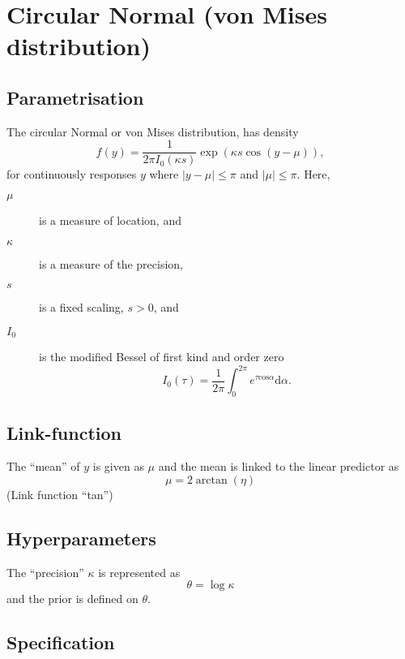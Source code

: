 \documentclass[a4paper,11pt]{article}
\begin{document}
\section*{Circular Normal (von Mises distribution)}

\subsection*{Parametrisation}

The circular Normal or von Mises distribution, has density
\begin{displaymath}
    f(y) = \frac{1}{2\pi  I_{0}(\kappa s)} \exp(\kappa s\cos(y-\mu)), 
\end{displaymath}
for continuously responses $y$ where $|y-\mu| \le \pi$ and $|\mu| \le
\pi$. Here,
\begin{description}
\item[$\mu$] is a measure of location, and
\item[$\kappa$] is a measure of the precision, 
\item[$s$] is a fixed scaling, $s>0$, and
\item[$I_0$] is the modified Bessel of first kind and order zero
    $$I_0(\tau)=\frac{1}{2\pi}\int_0^{2\pi}
    e^{\tau{\mathrm{cos}\alpha}}\mathrm{d}\alpha.$$
\end{description}

\subsection*{Link-function}

The ``mean'' of $y$ is given as $\mu$ and the mean is linked to the
linear predictor as
\begin{displaymath}
    \mu = 2\arctan(\eta)
\end{displaymath}
(Link function ``tan'')

\subsection*{Hyperparameters}

The ``precision'' $\kappa$ is represented as
\begin{displaymath}
    \theta = \log \kappa
\end{displaymath}
and the prior is defined on $\theta$.

\subsection*{Specification}
\end{document}
